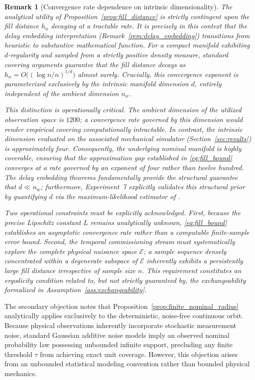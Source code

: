 \documentclass[a4paper]{cas-sc}
\newtheorem{remark}{Remark}
\newcommand{\EtaSpace}{\ensuremath{\mathcal{E}}}
\begin{document}
\begin{remark}[Convergence rate dependence on intrinsic dimensionality]
\label{rem:fill_rate}
The analytical utility of Proposition~\ref{prop:fill_distance} is strictly contingent upon the fill distance \(h_n\) decaying at a tractable rate. It is precisely in this context that the delay embedding interpretation (Remark~\ref{rem:delay_embedding}) transitions from heuristic to substantive mathematical function. For a compact manifold exhibiting \(d\)-regularity and sampled from a strictly positive density measure, standard covering arguments guarantee that the fill distance decays as \(h_n = O\bigl((\log n/n)^{1/d}\bigr)\) almost surely. Crucially, this convergence exponent is parameterized exclusively by the \emph{intrinsic} manifold dimension \(d\), entirely independent of the ambient dimension \(n_w\).

This distinction is operationally critical. The ambient dimension of the utilized observation space is \(1200\); a convergence rate governed by this dimension would render empirical covering computationally intractable. In contrast, the intrinsic dimension evaluated on the associated mechanical simulator (Section~\ref{sec:results}) is approximately four. Consequently, the underlying nominal manifold is highly coverable, ensuring that the approximation gap established in \eqref{eq:fill_bound} converges at a rate governed by an exponent of four rather than twelve hundred. The delay embedding theorems fundamentally provide the structural guarantee that \(d\ll n_w\); furthermore, Experiment~7 explicitly validates this structural prior by quantifying \(d\) via the maximum-likelihood estimator of \citet{levina2004}.

Two operational constraints must be explicitly acknowledged. First, because the precise Lipschitz constant \(L\) remains analytically unknown, \eqref{eq:fill_bound} establishes an asymptotic convergence rate rather than a computable finite-sample error bound. Second, the temporal commissioning stream must systematically explore the complete physical nuisance space \(\EtaSpace\); a sample sequence densely concentrated within a degenerate subspace of \(\EtaSpace\) inherently exhibits a persistently large fill distance irrespective of sample size \(n\). This requirement constitutes an ergodicity condition related to, but not strictly guaranteed by, the exchangeability formalized in Assumption~\ref{ass:exchangeability}.
\end{remark}

The secondary objection notes that Proposition~\ref{prop:finite_nominal_radius} analytically applies exclusively to the deterministic, noise-free continuous orbit. Because physical observations inherently incorporate stochastic measurement noise, standard Gaussian additive noise models imply an observed nominal probability law possessing unbounded infinite support, precluding any finite threshold \(\tau\) from achieving exact unit coverage. However, this objection arises from an unbounded statistical modeling convention rather than bounded physical mechanics.
\end{document}
